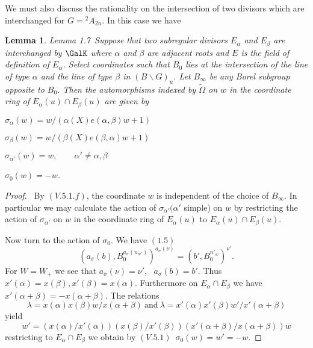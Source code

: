 \documentclass{memo-l}
\newtheorem{lemma}[theorem]{Lemma}
\theoremstyle{definition}
\theoremstyle{remark}
\numberwithin{section}{chapter}
\numberwithin{equation}{chapter}
\begin{document}
{\medskip}

   We must also discuss the rationality on the intersection of two divisors
which are interchanged for $G  = {}^{2}A_{2n}$.  In this case we have

\medpagebreak

\begin{lemma}{Lemma 1.7}\  Suppose that two subregular divisors
$E_{{\alpha}}$ and $E_{{\beta}}$ are interchanged by $\GalK$ where
${\alpha}$ and ${\beta}$ are adjacent roots and $E$ is the field of
definition of $E_{{\alpha}}$.  Select coordinates such that $B_{0}$ lies at
the intersection of the line of type ${\alpha}$ and the line of type
${\beta}$ in $(B\backslash G)_{u}$.  Let $B_{ \infty}$ be any Borel
subgroup opposite to $B_{0}$.  Then the automorphisms indexed by $\tilde{\Omega}$
on $w$
in the coordinate ring of $E_{{\alpha}}(u)  \cap  E_{{\beta}}(u)$ are given
by

   ${\sigma}_{{\alpha}}(w)  =  w/({\alpha}(X)e({\alpha},{\beta})w+1)$

   ${\sigma}_{{\beta}}(w)  =  w/({\beta}(X)e({\beta},{\alpha})w+1)$

   ${\sigma}_{{\alpha}'}(w)  =  w, \qquad {\alpha}' \ne {\alpha},{\beta}$

   ${\sigma}_{0}(w)  =  -w$.
\end{lemma}

\medpagebreak

\begin{proof} \  By $(V.5.1.f)$, the coordinate $w$ is independent of
the choice of $B_{{\infty}}$.  In particular we may calculate the action of
${\sigma}_{{\alpha}'} ({\alpha}'$ simple) on $w$ by restricting the action
of ${\sigma}_{{\alpha}'}$ on $w$ in the coordinate ring of
$E_{{\alpha}}(u)$ to $E_{{\alpha}}(u)  \cap  E_{{\beta}}(u)$.

   Now turn to the action of ${\sigma}_{0}$.  We have $(1.5)$
$$
(a_{{\sigma}}(b),B_{0}^{a_{{\sigma}}(n_{w'})})^{a_{{\sigma}}({\nu})}
=  (b',B_{0}^{n'_{w}})^{{\nu}'} .
$$
For $W = W_{+}$ we see that $a_{{\sigma}}({\nu})  =  {\nu}'$, \ $a_{{\sigma}}(b)  =
b'$.  Thus $x'({\alpha})  =  x({\beta}), x'({\beta})  =  x({\alpha})$.
Furthermore on $E_{{\alpha}}  \cap  E_{{\beta}}$ we have
$x'({\alpha}+{\beta})  =  -x({\alpha}+{\beta})$.  The relations
$$
{\lambda}  =  x({\alpha})x({\beta})w/x({\alpha}+{\beta})\ {\text{and}}\
{\lambda}  =  x'({\alpha})x'({\beta})w'/x'({\alpha}+{\beta})
$$
yield
$$
w'  =
(x({\alpha})/x'({\alpha}))(x({\beta})/x'({\beta}))(x'({\alpha}+{\beta})/x({\alpha}+{\beta}))w
$$
restricting to $E_{{\alpha}}  \cap  E_{{\beta}}$ we obtain by $(V.5.1)$\
${\sigma}_{0}(w)  =  w'  =  -w$.
\end{proof}
\end{document}
